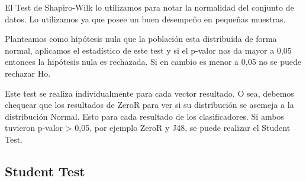 \documentclass[11pt,a4paper,twoside]{tesis}
\begin{document}

El Test de Shapiro-Wilk lo utilizamos para notar la normalidad del conjunto de datos. Lo utilizamos ya que posee un buen desempeño en pequeñas muestras.


Planteamos como hipótesis nula que la población esta distribuida de forma normal, aplicamos el estadístico de este test y si el p-valor nos da mayor a 0,05 entonces la hipótesis nula es rechazada. Si en cambio es menor a 0,05 no se puede rechazar Ho.

Este test se realiza individualmente para cada vector resultado. O sea, debemos chequear que los resultados de ZeroR para ver si su distribución se asemeja a la distribución Normal. Esto para cada resultado de los clasificadores. Si ambos tuvieron p-valor > 0,05, por ejemplo ZeroR y J48, se puede realizar el Student Test. 

\subsection{Student Test}


\end{document}
